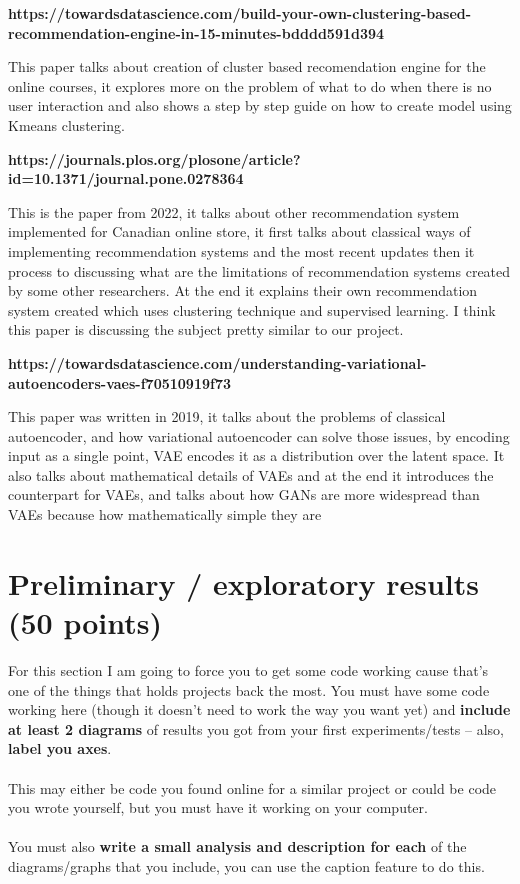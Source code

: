 \documentclass{article}
\begin{document}
\textbf{https://towardsdatascience.com/build-your-own-clustering-based-recommendation-engine-in-15-minutes-bdddd591d394}

This paper talks about creation of cluster based recomendation engine for the online courses, it explores more on the problem of what to do when there is no user interaction and also shows a step by step guide on how to create model using Kmeans clustering.

\textbf{https://journals.plos.org/plosone/article?id=10.1371/journal.pone.0278364}

This is the paper from 2022, it talks about other recommendation system implemented for Canadian online store, it first talks about classical ways of implementing recommendation systems and the most recent updates then it process to discussing what are the limitations of recommendation systems created by some other researchers. At the end it explains their own recommendation system created which uses clustering technique and supervised learning. I think this paper is discussing the subject pretty similar to our project.

\textbf{https://towardsdatascience.com/understanding-variational-autoencoders-vaes-f70510919f73}

This paper was written in 2019, it talks about the problems of classical autoencoder, and how variational autoencoder can solve those issues, by encoding input as a single point, VAE encodes it as a distribution over the latent space. It also talks about mathematical details of VAEs and at the end it introduces the counterpart for VAEs, and talks about  how GANs are more widespread than VAEs because how mathematically simple they are
\section{Preliminary / exploratory results (50 points)}

For this section I am going to force you to get some code working cause that's one of the things that holds projects back the most.
You must have some code working here (though it doesn't need to work the way you want yet) and \textbf{include at least 2 diagrams} of results you got from your first experiments/tests -- also, \textbf{label you axes}. \\ \\
This may either be code you found online for a similar project or could be code you wrote yourself, but you must have it working on your computer. \\ \\
You must also \textbf{write a small analysis and description for each} of the diagrams/graphs that you include, you can use the caption feature to do this. \\ \\ \\ \\
\end{document}
